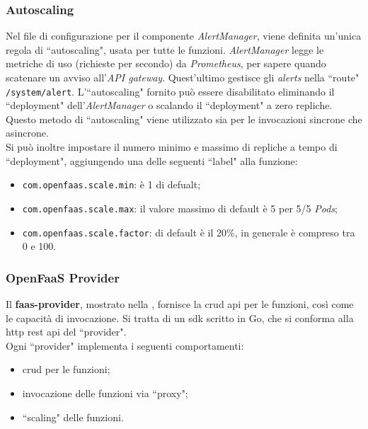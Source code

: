 \documentclass[12pt,a4paper,openany,twoside]{book}
\begin{document}
\subsubsection{Autoscaling}

Nel file di configurazione per il componente \textit{AlertManager}, viene definita un'unica regola di ``autoscaling", usata per tutte le funzioni. \textit{AlertManager} legge le metriche di uso (richieste per secondo) da \textit{Prometheus}, per sapere quando scatenare un avviso all'\textit{API gateway}. Quest'ultimo gestisce gli \textit{alerts} nella ``route" \texttt{/system/alert}. L'``autoscaling" fornito può essere disabilitato eliminando il ``deployment"  dell'\textit{AlertManager} o scalando il ``deployment" a zero repliche. Questo metodo di ``autoscaling" viene utilizzato sia per le invocazioni sincrone che asincrone.
\\
Si può inoltre impostare il numero minimo e massimo di repliche a tempo di ``deployment", aggiungendo una delle seguenti ``label" alla funzione:
\begin{itemize}
    \item \texttt{com.openfaas.scale.min}: è 1 di defualt;
    
    \item \texttt{com.openfaas.scale.max}: il valore massimo di default è 5 per 5/5 \textit{Pods};
    
    \item \texttt{com.openfaas.scale.factor}: di default è il 20\%, in generale è compreso tra 0 e 100.
\end{itemize}

\subsubsection{OpenFaaS Provider}

Il \textbf{faas-provider}, mostrato nella , fornisce la \ac{crud} \ac{api} per le funzioni, così come le capacità di invocazione. Si tratta di un \ac{sdk} scritto in Go, che si conforma alla \ac{http} \ac{rest} \ac{api} del ``provider".
\\
Ogni ``provider" implementa i seguenti comportamenti:
\begin{itemize}
    \item \ac{crud} per le funzioni;
    
    \item invocazione delle funzioni via ``proxy";
    
    \item ``scaling" delle funzioni.
\end{itemize}
\end{document}
